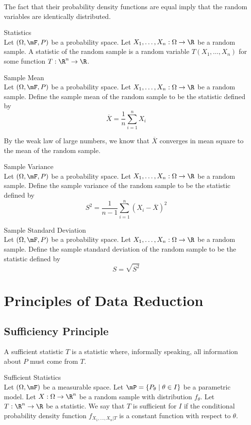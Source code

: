 \documentclass[a4paper]{article}
\begin{document}
The fact that their probability density functions are equal imply that the random variables are identically distributed. 

\begin{defn}{Statistics}{}\\
Let $(\Omega,\mF,P)$ be a probability space. Let $X_1,\dots,X_n:\Omega\to\R$ be a random sample. A statistic of the random sample is a random variable $T(X_1,\dots,X_n)$ for some function $T:\R^n\to\R$. 
\end{defn}

\begin{defn}{Sample Mean}{}\\
Let $(\Omega,\mF,P)$ be a probability space. Let $X_1,\dots,X_n:\Omega\to\R$ be a random sample. Define the sample mean of the random sample to be the statistic defined by $$\overline{X}=\frac{1}{n}\sum_{i=1}^nX_i$$
\end{defn}

By the weak law of large numbers, we know that $\overline{X}$ converges in mean square to the mean of the random sample. 

\begin{defn}{Sample Variance}{}\\
Let $(\Omega,\mF,P)$ be a probability space. Let $X_1,\dots,X_n:\Omega\to\R$ be a random sample. Define the sample variance of the random sample to be the statistic defined by $$S^2=\frac{1}{n-1}\sum_{i=1}^n(X_i-\overline{X})^2$$
\end{defn}

\begin{defn}{Sample Standard Deviation}{}\\
Let $(\Omega,\mF,P)$ be a probability space. Let $X_1,\dots,X_n:\Omega\to\R$ be a random sample. Define the sample standard deviation of the random sample to be the statistic defined by $$S=\sqrt{S^2}$$
\end{defn}

\pagebreak
\section{Principles of Data Reduction}
\subsection{Sufficiency Principle}
A sufficient statistic $T$ is a statistic where, informally speaking, all information about $P$ must come from $T$. 

\begin{defn}{Sufficient Statistics}{}\\
Let $(\Omega,\mF)$ be a measurable space. Let $\mP=\{P_\theta\;|\;\theta\in I\}$ be a parametric model. Let $X:\Omega\to\R^n$ be a random sample with distribution $f_\theta$. Let $T:\R^n\to\R$ be a statistic. We say that $T$ is sufficient for $I$ if the conditional probability density function $f_{X_1,\dots,X_n|T}$ is a constant function with respect to $\theta$. 
\end{defn}
\end{document}
